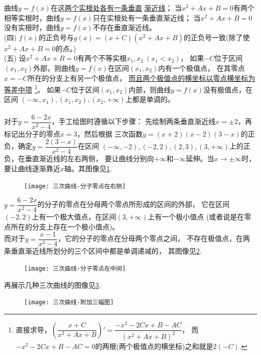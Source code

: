 \begin{enumerate}[label={【\textbf{例\thechapter.\arabic*}】},
 leftmargin=\inteval{\myenumleftmargin}pt,
 itemsep=\inteval{\myenumitempsep}pt,
 itemindent=\inteval{\myenumitemindent}pt]
曲线$y=f(x)$在这\underline{两个实根处各有一条垂直}
\underline{渐近线}；
当$x^2+Ax+B=0$有两个相等实根时，曲线$y=f(x)$只在实根处有一条垂直渐近线；
当$x^2+Ax+B=0$没有实根时，曲线$y=f(x)$不存在垂直渐近线。\\
(四) $f(x)$的正负号与$g(x)=(x+C)(x^2+Ax+B)$的正负号一致(除了使$x^2+Ax+B=0$的点。)\\
(五) 设$x^2+Ax+B=0$有两个不等实根$x_1,x_2\ (x_1<x_2)$，
如果$-C$位于区间$(x_1,x_2)$外部，则曲线$y=f(x)$在区间$(x_1,x_2)$内有一个极值点，
在其零点$x=-C$所在的分支上有另一个极值点，
\underline{而且两个极值点的横坐标以零点横坐标为等差中项}
\footnote{直接求导，$\left(\dfrac{x+C}{x^2+Ax+B}\right)'=
    \dfrac{-x^2-2Cx+B-AC}{(x^2+Ax+B)^2}$，
    而$-x^2-2Cx+B-AC=0$的两根(两个极值点的横坐标)之和就是$2(-C)$. }。
如果$-C$位于区间$(x_1,x_2)$内部，则曲线$y=f(x)$没有极值点，在区间
$(-\infty,x_1),(x_1,x_2),(x_2,+\infty)$上都是单调的。\\
\\
对于$ y=\dfrac{6-2x}{x^2-4} $，手工绘图时遵循以下步骤：
先绘制两条垂直渐近线$ x=\pm 2 $，再标记出分子的零点$x=3$，然后根据
三次函数$y=(x+2)(x-2)(3-x) $的正负，确定$ y=\dfrac{2(3-x)}{x^2-4} $在区间
$ (-\infty,-2),(-2,2),(2,3),(3,+\infty) $上的正负，在垂直渐近线的左右两侧，
要让曲线分别向$+\infty$和$-\infty$延伸。当$ x\to \pm\infty $时，
要让曲线逐渐靠近$ x $轴。其图像见\ref{(6-2x)_(x^2-4)图像}.
\begin{figure}[h] %
    \centering
    \texttt{[image: 三次曲线-分子零点在右侧]}
    \caption{}
    \label{(6-2x)_(x^2-4)图像}
\end{figure}

$ y=\dfrac{6-2x}{x^2-4} $的分子的零点在分母两个零点所形成的区间的外部，
它在区间$(-2,2)$上有一个极大值点，在区间$(3,+\infty)$上有一个极小值点
(或者说是在零点所在的分支上存在一个极小值点)。\\
而对于$ y=\dfrac{x-1}{x^2-4} $，它的分子的零点在分母两个零点之间，
不存在极值点，在两条垂直渐近线所划分的三个区间中都是单调递减的，
其图像见\ref{(x-1)_(x^2-4)图像}.
\begin{figure}[h] %
    \centering
    \texttt{[image: 三次曲线-分子零点在中间]}
        \caption{}
    \label{(x-1)_(x^2-4)图像}
\end{figure} 

再展示几种三次曲线的图像见\ref{另外3种三次曲线图像}.
\begin{figure}[h] %
    \centering
    \texttt{[image: 三次曲线-附加三幅图]}
    \caption{}
    \label{另外3种三次曲线图像}
\end{figure} 


\end{enumerate}
